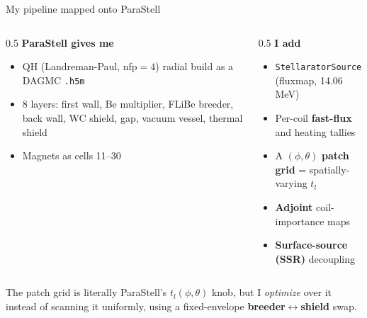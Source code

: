 \documentclass[aspectratio=169]{beamer}
\newcommand{\kb}[1]{\begin{tcolorbox}[colback=key!5,colframe=key!60,boxsep=2pt,left=4pt,right=4pt,top=3pt,bottom=3pt]#1\end{tcolorbox}}
\begin{document}
\begin{frame}{My pipeline mapped onto ParaStell}
  \begin{columns}[t]
    \begin{column}{0.5\textwidth}
      \textbf{ParaStell gives me}
      \begin{itemize}\small
        \item QH (Landreman-Paul, nfp$=4$) radial build as a DAGMC \texttt{.h5m}
        \item 8 layers: first wall, Be multiplier, FLiBe breeder, back wall, WC shield, gap, vacuum vessel, thermal shield
        \item Magnets as cells 11--30
      \end{itemize}
    \end{column}
    \begin{column}{0.5\textwidth}
      \textbf{I add}
      \begin{itemize}\small
        \item \texttt{StellaratorSource} (fluxmap, 14.06 MeV)
        \item Per-coil \textbf{fast-flux} and heating tallies
        \item A $(\phi,\theta)$ \textbf{patch grid} = spatially-varying $t_l$
        \item \textbf{Adjoint} coil-importance maps
        \item \textbf{Surface-source (SSR)} decoupling
      \end{itemize}
    \end{column}
  \end{columns}
  \vspace{0.4em}
  \kb{\footnotesize The patch grid is literally ParaStell's $t_l(\phi,\theta)$ knob, but I \emph{optimize} over it instead of scanning it uniformly, using a fixed-envelope \textbf{breeder$\leftrightarrow$shield} swap.}
\end{frame}
\end{document}
